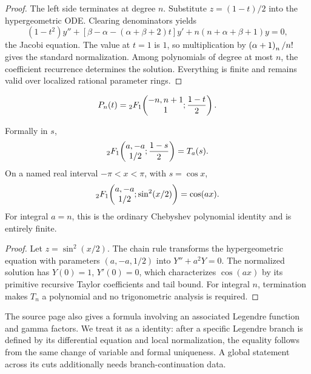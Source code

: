 \begin{proof}
The left side terminates at degree \(n\).  Substitute \(z=(1-t)/2\) into the
hypergeometric ODE.  Clearing denominators yields
\[
 (1-t^2)y''+[\beta-\alpha-(\alpha+\beta+2)t]y'
 +n(n+\alpha+\beta+1)y=0,
\]
the Jacobi equation.  The value at \(t=1\) is \(1\), so multiplication by
\(\left(\alpha+1\right)_{n}/n!\) gives the standard normalization.  Among polynomials
of degree at most \(n\), the coefficient recurrence determines the solution.
Everything is finite and remains valid over localized rational parameter
rings.
\end{proof}

\begin{corollary}
\[
 P_n(t)={}_2F_1\!\left(\begin{matrix}-n,n+1\\1\end{matrix};\frac{1-t}{2}\right).
\]
\end{corollary}

\begin{theorem}\label{thm:chebyshev}
Formally in \(s\),
\[
 {}_2F_1\!\left(\begin{matrix}a,-a\\1/2\end{matrix};\frac{1-s}{2}\right)=T_a(s).
\]
On a named real interval \(-\pi<x<\pi\), with \(s=\cos x\),
\[
 {}_2F_1\!\left(\begin{matrix}a,-a\\1/2\end{matrix};\sin^2(x/2)\right)=\cos(ax).
\]
For integral \(a=n\), this is the ordinary Chebyshev polynomial identity and
is entirely finite.
\end{theorem}

\begin{proof}
Let \(z=\sin^2(x/2)\).  The chain rule transforms the hypergeometric equation
with parameters \((a,-a,1/2)\) into
\(Y''+a^2Y=0\).  The normalized solution has
\(Y(0)=1\), \(Y'(0)=0\), which characterizes \(\cos(ax)\) by its primitive
recursive Taylor coefficients and tail bound.  For integral \(n\), termination
makes \(T_n\) a polynomial and no trigonometric analysis is required.
\end{proof}

\begin{remark}
The source page also gives a formula involving an associated Legendre
function and gamma factors.  We treat it as a \StatusC{} identity: after a
specific Legendre branch is defined by its differential equation and local
normalization, the equality follows from the same change of variable and
formal uniqueness.  A global statement across its cuts additionally needs
branch-continuation data.
\end{remark}
